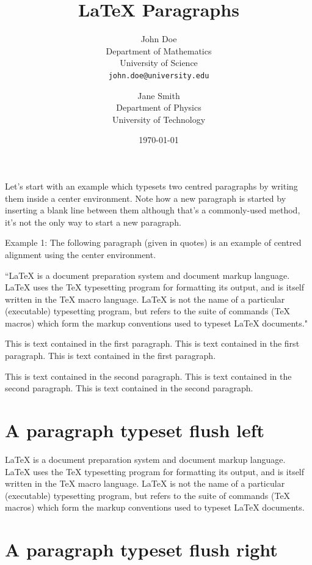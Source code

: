 \documentclass{article}
\title{\Large LaTeX Paragraphs}
\author{
	John Doe \\
	Department of Mathematics \\
	University of Science \\
	\texttt{john.doe@university.edu}
	\and
	Jane Smith \\
	Department of Physics \\
	University of Technology
}
\date{\today}
\begin{document}
	
	\maketitle
	
	Let's start with an example which typesets two centred paragraphs by writing them inside a center environment. Note how a new paragraph is started by inserting a blank line between them although that's a commonly-used method, it's not the only way to start a new paragraph.
	
	Example 1: The following paragraph (given in quotes) is an 
	example of centred alignment using the center environment. 
	
	\begin{center}
		``La\TeX{} is a document preparation system and document markup 
		language. \LaTeX{} uses the \TeX{} typesetting program for formatting 
		its output, and is itself written in the \TeX{} macro language. 
		\LaTeX{} is not the name of a particular (executable) typesetting program, but 
		refers to the suite of commands (\TeX{} macros) which form the markup 
		conventions used to typeset \LaTeX{} documents." 
	\end{center}
	
	This is text contained in the first paragraph. 
	This is text contained in the first paragraph. 
	This is text contained in the first paragraph.\par
	This is text contained in the second paragraph. 
	This is text contained in the second paragraph.
	This is text contained in the second paragraph.
	
	\section*{A paragraph typeset flush left}
	
	\begin{flushleft}
		La\TeX{} is a document preparation system and document markup 
		language. \LaTeX{} uses the \TeX{} typesetting program for formatting 
		its output, and is itself written in the \TeX{} macro language. 
		\LaTeX{} is not the name of a particular (executable) typesetting program, but 
		refers to the suite of commands (\TeX{} macros) which form the markup 
		conventions used to typeset \LaTeX{} documents.
	\end{flushleft}
	
	\section*{A paragraph typeset flush right}
	
\end{document}
